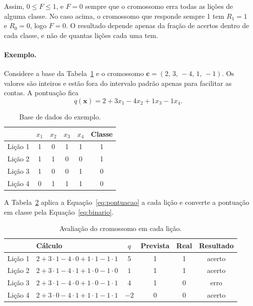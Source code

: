 \documentclass[11pt,a4paper]{article}
\newcommand{\cromo}{\mathbf{c}}
\begin{document}
Assim, $0 \leq F \leq 1$, e $F = 0$ sempre que o cromossomo erra todas as lições de
alguma classe. No caso acima, o cromossomo que responde sempre 1 tem $R_1 = 1$ e
$R_0 = 0$, logo $F = 0$. O resultado depende apenas da fração de acertos dentro de cada
classe, e não de quantas lições cada uma tem.

\paragraph{Exemplo.} Considere a base da Tabela~\ref{tab:base} e o cromossomo
$\cromo = (2,\, 3,\, -4,\, 1,\, -1)$. Os valores são inteiros e estão fora do intervalo
padrão apenas para facilitar as contas. A pontuação fica
\begin{equation*}
  q(\mathbf{x}) = 2 + 3x_1 - 4x_2 + 1x_3 - 1x_4.
\end{equation*}

\begin{table}[ht]
\centering
\caption{Base de dados do exemplo.}
\label{tab:base}
\begin{tabular}{lccccc}
\toprule
 & $x_1$ & $x_2$ & $x_3$ & $x_4$ & Classe \\
\midrule
Lição 1 & 1 & 0 & 1 & 1 & 1 \\
Lição 2 & 1 & 1 & 0 & 0 & 1 \\
Lição 3 & 1 & 0 & 0 & 1 & 0 \\
Lição 4 & 0 & 1 & 1 & 1 & 0 \\
\bottomrule
\end{tabular}
\end{table}

A Tabela~\ref{tab:avaliacao} aplica a Equação~\eqref{eq:pontuacao} a cada lição e
converte a pontuação em classe pela Equação~\eqref{eq:binario}.

\begin{table}[ht]
\centering
\caption{Avaliação do cromossomo em cada lição.}
\label{tab:avaliacao}
\begin{tabular}{llcccc}
\toprule
 & Cálculo & $q$ & Prevista & Real & Resultado \\
\midrule
Lição 1 & $2 + 3\cdot1 - 4\cdot0 + 1\cdot1 - 1\cdot1$ & $5$  & 1 & 1 & acerto \\
Lição 2 & $2 + 3\cdot1 - 4\cdot1 + 1\cdot0 - 1\cdot0$ & $1$  & 1 & 1 & acerto \\
Lição 3 & $2 + 3\cdot1 - 4\cdot0 + 1\cdot0 - 1\cdot1$ & $4$  & 1 & 0 & erro \\
Lição 4 & $2 + 3\cdot0 - 4\cdot1 + 1\cdot1 - 1\cdot1$ & $-2$ & 0 & 0 & acerto \\
\bottomrule
\end{tabular}
\end{table}
\end{document}
